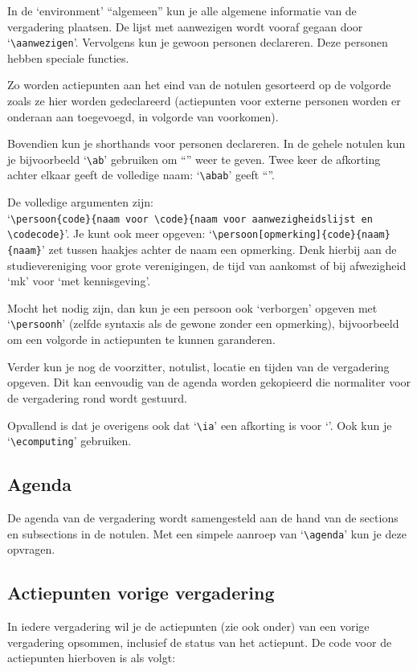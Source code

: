 \documentclass[a4paper]{notulen}
\begin{document}
			In de `environment' ``algemeen'' kun je alle algemene informatie van de vergadering plaatsen. De lijst met aanwezigen wordt
			vooraf gegaan door `\lstinline!\aanwezigen!'. Vervolgens kun je gewoon personen declareren. Deze personen hebben speciale functies.
			
			Zo worden actiepunten aan het eind van de notulen gesorteerd op de volgorde zoals ze hier worden gedeclareerd (actiepunten voor externe
			personen worden er onderaan aan toegevoegd, in volgorde van voorkomen). 
			
			Bovendien kun je shorthands voor personen declareren. In de gehele notulen kun je bijvoorbeeld `\lstinline!\ab!' gebruiken om ``\ab''
			weer te geven. Twee keer de afkorting achter elkaar geeft de volledige naam: `\lstinline!\abab!' geeft ``\abab''.
			
			De volledige argumenten zijn:\\ `\lstinline!\persoon{code}{naam voor \code}{naam voor aanwezigheidslijst en \codecode}!'. Je kunt ook meer opgeven:
			`\lstinline!\persoon[opmerking]{code}{naam}{naam}!' zet tussen haakjes achter de naam een opmerking. Denk hierbij aan de studievereniging voor grote
			verenigingen, de tijd van aankomst of bij afwezigheid `mk' voor `met kennisgeving'.
			
			Mocht het nodig zijn, dan kun je een persoon ook `verborgen' opgeven met `\lstinline!\persoonh!' (zelfde syntaxis als de gewone zonder een opmerking),
			bijvoorbeeld om een volgorde in actiepunten te kunnen garanderen.
			
			Verder kun je nog de voorzitter, notulist, locatie en tijden van de vergadering opgeven. Dit kan eenvoudig van de agenda worden gekopieerd die 
			normaliter voor de vergadering rond wordt gestuurd.
			
			Opvallend is dat je overigens ook dat `\lstinline!\ia!' een afkorting is voor `\ia'. Ook kun je `\lstinline!\ecomputing!' gebruiken.
		
		\subsection{Agenda}
			De agenda van de vergadering wordt samengesteld aan de hand van de sections en subsections in de notulen. Met een simpele aanroep van
			`\lstinline!\agenda!' kun je deze opvragen.
			
		\subsection{Actiepunten vorige vergadering}
			In iedere vergadering wil je de actiepunten (zie ook onder) van een vorige vergadering opsommen, inclusief de status van het actiepunt.
			De code voor de actiepunten hierboven is als volgt:
			
\end{document}
